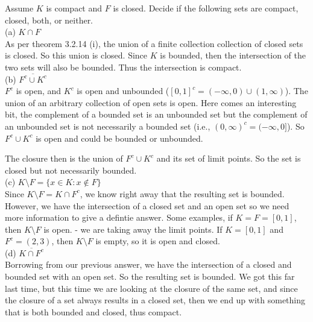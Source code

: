 Assume $K$ is compact and $F$ is closed.
Decide if the following sets are compact, closed, both, or neither.
\\

(a) $K \cap F$
\\

As per theorem 3.2.14 (i), the union of a finite collection collection of closed sets is closed.
So this union is closed.
Since $K$ is bounded, then the intersection of the two sets will also be bounded.
Thus the intersection is compact.
\\

(b) $\overline{F^c \cup K^c}$
\\

$F^c$ is open, and $K^c$ is open and unbounded ($[0,1]^c = (-\infty,0) \cup (1, \infty)$).
The union of an arbitrary collection of open sets is open.
Here comes an interesting bit, the complement of a bounded set is an unbounded set but the complement of an
unbounded set is not necessarily a bounded set (i.e., $(0,\infty)^c = (-\infty,0]$).
So $F^c \cup K^c$ is open and could be bounded or unbounded.

The closure then is the union of $F^c \cup K^c$ and its set of limit points.
So the set is closed but not necessarily bounded.
\\

(c) $K\setminus F = \{ x \in K : x\not\in F \}$
\\

Since $K \setminus F = K \cap F^c$, we know right away that the resulting set is bounded.
However, we have the intersection of a closed set and an open set so we need more information to give a defintie answer.
Some examples, if $K = F = [0,1]$, then $K \setminus F$ is open. - we are taking away the limit points.
If $K = [0,1]$ and $F^c = (2,3)$, then $K \setminus F$ is empty, so it is open and closed.
\\

(d) $\overline{K \cap F^c}$
\\

Borrowing from our previous answer, we have the intersection of a closed and bounded set with an open set.
So the resulting set is bounded.
We got this far last time, but this time we are looking at the closure of the same set, and since the closure of
a set always results in a closed set, then we end up with something that is both bounded and closed, thus
compact.
\\~\\



